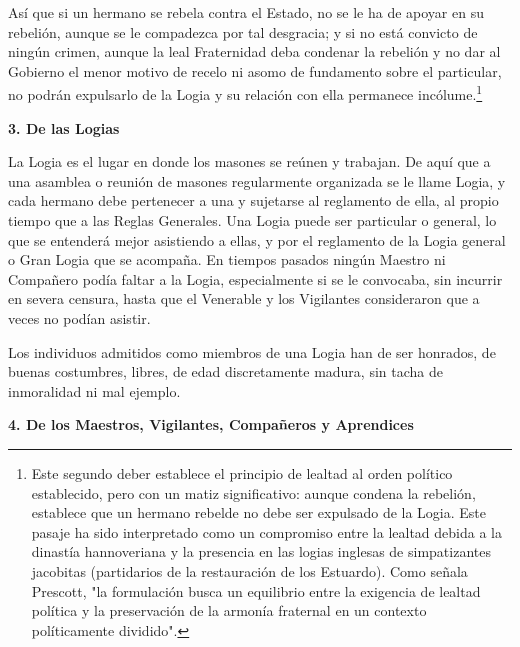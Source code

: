 \documentclass[a4paper,12pt,twoside]{book}
\begin{document}
\noindent Así que si un hermano se rebela contra el Estado, no se le ha de apoyar en su rebelión, aunque se le compadezca por tal desgracia; y si no está convicto de ningún crimen, aunque la leal Fraternidad deba condenar la rebelión y no dar al Gobierno el menor motivo de recelo ni asomo de fundamento sobre el particular, no podrán expulsarlo de la Logia y su relación con ella permanece incólume.\footnote{Este segundo deber establece el principio de lealtad al orden político establecido, pero con un matiz significativo: aunque condena la rebelión, establece que un hermano rebelde no debe ser expulsado de la Logia. Este pasaje ha sido interpretado como un compromiso entre la lealtad debida a la dinastía hannoveriana y la presencia en las logias inglesas de simpatizantes jacobitas (partidarios de la restauración de los Estuardo). Como señala Prescott, "la formulación busca un equilibrio entre la exigencia de lealtad política y la preservación de la armonía fraternal en un contexto políticamente dividido".}

\vspace{0.5cm}

\noindent \textbf{3. De las Logias}

\noindent La Logia es el lugar en donde los masones se reúnen y trabajan. De aquí que a una asamblea o reunión de masones regularmente organizada se le llame Logia, y cada hermano debe pertenecer a una y sujetarse al reglamento de ella, al propio tiempo que a las Reglas Generales. Una Logia puede ser particular o general, lo que se entenderá mejor asistiendo a ellas, y por el reglamento de la Logia general o Gran Logia que se acompaña. En tiempos pasados ningún Maestro ni Compañero podía faltar a la Logia, especialmente si se le convocaba, sin incurrir en severa censura, hasta que el Venerable y los Vigilantes consideraron que a veces no podían asistir.

\noindent Los individuos admitidos como miembros de una Logia han de ser honrados, de buenas costumbres, libres, de edad discretamente madura, sin tacha de inmoralidad ni mal ejemplo. 

\vspace{0.5cm}

\noindent \textbf{4. De los Maestros, Vigilantes, Compañeros y Aprendices}
\end{document}
